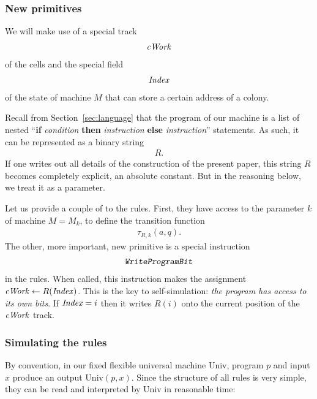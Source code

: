 \documentclass[12pt]{memoir}
\newcommand{\fld}[1]{\ensuremath{\textit{#1\/}}}
\newcommand{\rul}[1]{\ensuremath{\texttt{\slshape #1\/}}}
\newcommand{\Index}{\fld{Index}}
\newcommand{\cWork}{\fld{cWork}}
\newcommand{\Un}{\mathrm{Univ}}
\newcommand{\WriteProgramBit}{\rul{WriteProgramBit}}
\begin{document}
\subsubsection{New primitives}

We will make use of a special track
\begin{align*}
   \cWork
 \end{align*}
of the cells and the special field
\begin{align*}
   \Index
 \end{align*}
of the state of machine \( M \) that can store a certain address of a colony.

Recall from Section~\ref{sec:language} that the program
of our machine is a list of nested
``\textbf{if} \emph{condition} \textbf{then} \emph{instruction}
\textbf{else} \emph{instruction}''
statements.
As such, it can be represented as a binary string 
 \begin{align*}
   R.
 \end{align*}
If one writes out all details of the construction of the present paper, this string \( R \)
becomes completely explicit, an absolute constant.
But in the reasoning below, we treat it as a parameter.

Let us provide a couple of  to the rules.
First, they have access to the parameter \( k \) of machine \( M=M_{k} \), 
to define the transition function
 \begin{align*}
            \tau_{R,k}(a,q).
 \end{align*}
The other, more important, new primitive is a special instruction
 \begin{align*}
   \WriteProgramBit
 \end{align*}
in the rules.
When called, this instruction makes the assignment \( \cWork\gets R(\Index) \).
This is the key to self-simulation: \emph{the program has
access to its own bits}.
If \( \Index=i \) then it writes \( R(i) \) onto the current position of the \( \cWork \) track.


\subsubsection{Simulating the rules}

By convention, in our fixed flexible universal machine \( \Un \),
program \( p \) and input \( x \) produce an output \( \Un(p,x) \).
Since the structure of all rules is very simple, they can be read and
interpreted by \( \Un \) in reasonable time:
\end{document}
